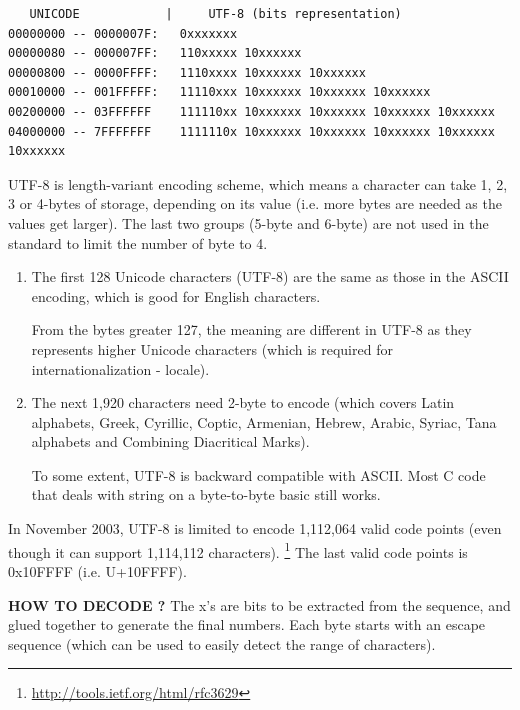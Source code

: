 \begin{verbatim}
   UNICODE            |     UTF-8 (bits representation)
00000000 -- 0000007F: 	0xxxxxxx
00000080 -- 000007FF: 	110xxxxx 10xxxxxx
00000800 -- 0000FFFF: 	1110xxxx 10xxxxxx 10xxxxxx
00010000 -- 001FFFFF: 	11110xxx 10xxxxxx 10xxxxxx 10xxxxxx
00200000 -- 03FFFFFF	111110xx 10xxxxxx 10xxxxxx 10xxxxxx 10xxxxxx
04000000 -- 7FFFFFFF	1111110x 10xxxxxx 10xxxxxx 10xxxxxx 10xxxxxx 10xxxxxx
\end{verbatim}

UTF-8 is length-variant encoding scheme, which means a character can take 1, 2,
3 or 4-bytes of storage, depending on its value (i.e. more bytes are needed as
the values get larger). The last two groups (5-byte and 6-byte) are not used in
the standard to limit the number of byte to 4.

\begin{enumerate}
  
  \item  The first 128 Unicode characters (UTF-8) are the same as those in the
  ASCII encoding, which is good for English characters.

From the bytes greater 127, the meaning are different in UTF-8 as they
represents higher Unicode characters (which is required for internationalization
- locale).

  \item The next 1,920 characters need 2-byte to encode (which covers Latin
  alphabets, Greek, Cyrillic, Coptic, Armenian, Hebrew, Arabic, Syriac, Tana
  alphabets and Combining Diacritical Marks).

To some extent, UTF-8 is backward compatible with ASCII. Most C code
that deals with string on a byte-to-byte basic still works.
  
\end{enumerate}
In November 2003, UTF-8 is limited to encode 1,112,064 valid code points (even
though it can support 1,114,112 characters).
\footnote{\url{http://tools.ietf.org/html/rfc3629}} The last valid code
points is 0x10FFFF (i.e. U+10FFFF).


{\bf HOW TO DECODE ?} The x's are bits to be extracted from the sequence, and
glued together to generate the final numbers. Each byte starts with an escape
sequence (which can be used to easily detect the range of characters).



